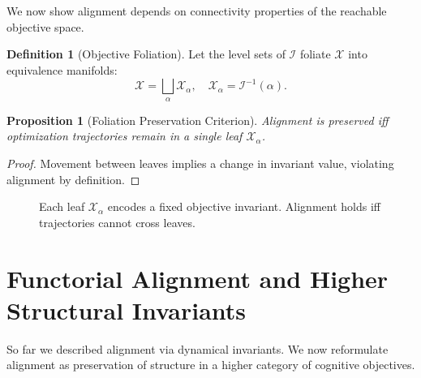 \documentclass[11pt,a4paper]{article}
\theoremstyle{plain}
\newtheorem{proposition}[theorem]{Proposition}
\theoremstyle{definition}
\newtheorem{definition}[theorem]{Definition}
\theoremstyle{remark}
\numberwithin{equation}{section}
\newcommand{\I}{\mathcal{I}}
\newcommand{\X}{\mathcal{X}}
\begin{document}
We now show alignment depends on connectivity properties of the reachable objective space.

\begin{definition}[Objective Foliation]
Let the level sets of $\I$ foliate $\X$ into equivalence manifolds:
\[
\X = \bigsqcup_{\alpha} \X_\alpha, \quad \X_\alpha = \I^{-1}(\alpha).
\]
\end{definition}

\begin{proposition}[Foliation Preservation Criterion]
Alignment is preserved iff optimization trajectories remain in a single leaf $\X_\alpha$.
\end{proposition}

\begin{proof}
Movement between leaves implies a change in invariant value, violating alignment by definition.
\end{proof}

\begin{figure}[H]
\centering
{}
\caption{Each leaf $\X_\alpha$ encodes a fixed objective invariant. Alignment holds iff trajectories cannot cross leaves.}
\end{figure}

\section{Functorial Alignment and Higher Structural Invariants}

So far we described alignment via dynamical invariants. We now reformulate alignment as preservation of structure in a higher category of cognitive objectives.
\end{document}
